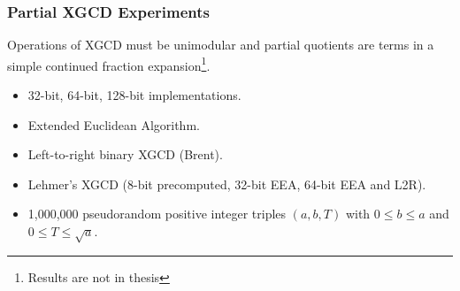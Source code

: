 \documentclass{beamer}
\begin{document}
\begin{frame}
\frametitle{Partial XGCD Experiments}
Operations of XGCD must be unimodular and partial quotients are terms in a simple continued fraction expansion\footnote{Results are not in thesis}.
\begin{itemize}
\item 32-bit, 64-bit, 128-bit implementations.
\item Extended Euclidean Algorithm.
\item Left-to-right binary XGCD (Brent).
\item Lehmer's XGCD (8-bit precomputed, 32-bit EEA, 64-bit EEA and L2R).
\item 1,000,000 pseudorandom positive integer triples $(a, b, T)$ with $0 \le b \le a$ and $0 \le T \le \sqrt a$.
\end{itemize}
\end{frame}
\end{document}
